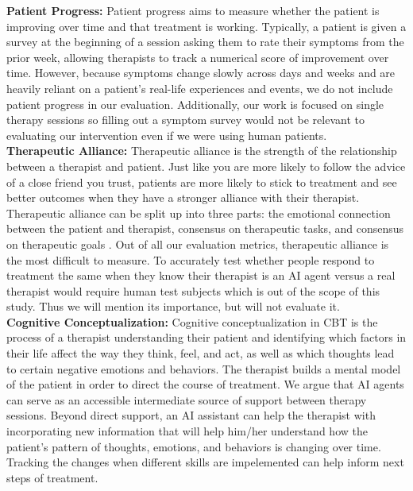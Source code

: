 \documentclass[twoside]{report}
\begin{document}
\textbf{Patient Progress:} Patient progress aims to measure whether the patient is improving over time and that treatment is working. Typically, a patient is given a survey at the beginning of a session asking them to rate their symptoms from the prior week, allowing therapists to track a numerical score of improvement over time. However, because symptoms change slowly across days and weeks and are heavily reliant on a patient's real-life experiences and events, we do not include patient progress in our evaluation. Additionally, our work is focused on single therapy sessions so filling out a symptom survey would not be relevant to evaluating our intervention even if we were using human patients.\\

\textbf{Therapeutic Alliance:} Therapeutic alliance is the strength of the relationship between a therapist and patient. Just like you are more likely to follow the advice of a close friend you trust, patients are more likely to stick to treatment and see better outcomes when they have a stronger alliance with their therapist. Therapeutic alliance can be split up into three parts: the emotional connection between the patient and therapist, consensus on therapeutic tasks, and consensus on therapeutic goals \cite{fluckiger2018alliance, perepletchikova2005treatment}. Out of all our evaluation metrics, therapeutic alliance is the most difficult to measure. To accurately test whether people respond to treatment the same when they know their therapist is an AI agent versus a real therapist would require human test subjects which is out of the scope of this study. Thus we will mention its importance, but will not evaluate it. \\

\textbf{Cognitive Conceptualization:} Cognitive conceptualization in CBT is the process of a therapist understanding their patient and identifying which factors in their life affect the way they think, feel, and act, as well as which thoughts lead to certain negative emotions and behaviors. The therapist builds a mental model of the patient in order to direct the course of treatment. We argue that AI agents can serve as an accessible intermediate source of support between therapy sessions. Beyond direct support, an AI assistant can help the therapist with incorporating new information that will help him/her understand how the patient's pattern of thoughts, emotions, and behaviors is changing over time. Tracking the changes when different skills are impelemented can help inform next steps of treatment.
\end{document}
